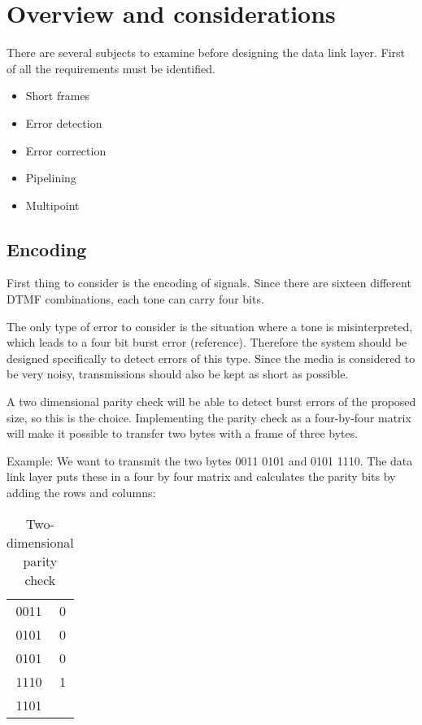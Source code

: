 \section{Overview and considerations}\label{sec:dll_theory}

There are several subjects to examine before designing the data link layer.
First of all the requirements must be identified. 
\begin{itemize}
	\item 	Short frames
	\item	Error detection
	\item	Error correction
	\item	Pipelining
	\item 	Multipoint
\end{itemize}

\subsection{Encoding}
First thing to consider is the encoding of signals. Since there are sixteen
different DTMF combinations, each tone can carry four bits.

The only type of error to consider is the situation where a tone is
misinterpreted, which leads to a four bit burst error (reference). Therefore the
system should be designed specifically to detect errors of this type. Since the media
is considered to be very noisy, transmissions should also be kept as short as
possible.

A two dimensional parity check will be able to detect burst errors of the
proposed size, so this is the choice. Implementing the parity check as a
four-by-four matrix will make it possible to transfer two bytes with a frame of
three bytes.

Example: We want to transmit the two bytes 0011 0101 and 0101 1110. The data
link layer puts these in a four by four matrix and calculates the parity bits by
adding the rows and columns:

\begin{table}[htb]
	\begin{center}
	\begin{tabular}{c|c}
	0011 & 0 \\
	0101 & 0 \\
	0101 & 0 \\
	1110 & 1 \\
	\hline
	1101 & \\
	\end{tabular}
	\end{center}
	\caption{Two-dimensional parity check}
	\label{tab:two_dimensional_parity_check}
\end{table}

